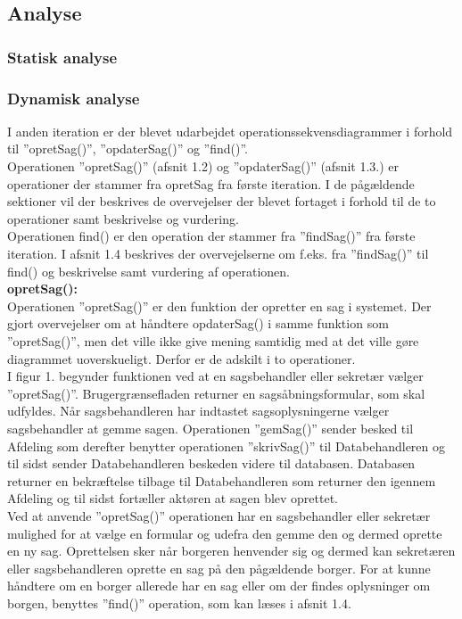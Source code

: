\subsection{Analyse}

\subsubsection{Statisk analyse}

\subsubsection{Dynamisk analyse}
I anden iteration er der blevet udarbejdet operationssekvensdiagrammer i forhold til ”opretSag()”, ”opdaterSag()” og ”find()”. \\
Operationen ”opretSag()” (afsnit 1.2) og ”opdaterSag()” (afsnit 1.3.) er operationer der stammer fra opretSag fra første iteration. I de pågældende sektioner vil der beskrives de overvejelser der blevet fortaget i forhold til de to operationer samt beskrivelse og vurdering. \\
Operationen find() er den operation der stammer fra ”findSag()” fra første iteration. I afsnit 1.4 beskrives der overvejelserne om f.eks. fra ”findSag()” til find() og beskrivelse samt vurdering af operationen.\\ 
\textbf{opretSag():}\\ 
Operationen ”opretSag()” er den funktion der opretter en sag i systemet. Der gjort overvejelser om at håndtere opdaterSag() i samme funktion som ”opretSag()”, men det ville ikke give mening samtidig med at det ville gøre diagrammet uoverskueligt. Derfor er de adskilt i to operationer. \\
I figur 1. begynder funktionen ved at en sagsbehandler eller sekretær vælger ”opretSag()”. Brugergrænsefladen returner en sagsåbningsformular, som skal udfyldes. Når sagsbehandleren har indtastet sagsoplysningerne vælger sagsbehandler at gemme sagen. Operationen ”gemSag()” sender besked til Afdeling som derefter benytter operationen ”skrivSag()” til Databehandleren og til sidst sender Databehandleren beskeden videre til databasen. Databasen returner en bekræftelse tilbage til Databehandleren som returner den igennem Afdeling og til sidst fortæller aktøren at sagen blev oprettet. \\
Ved at anvende ”opretSag()” operationen har en sagsbehandler eller sekretær mulighed for at vælge en formular og udefra den gemme den og dermed oprette en ny sag. Oprettelsen sker når borgeren henvender sig og dermed kan sekretæren eller sagsbehandleren oprette en sag på den pågældende borger. For at kunne håndtere om en borger allerede har en sag eller om der findes oplysninger om borgen, benyttes ”find()” operation, som kan læses i afsnit 1.4.\\
